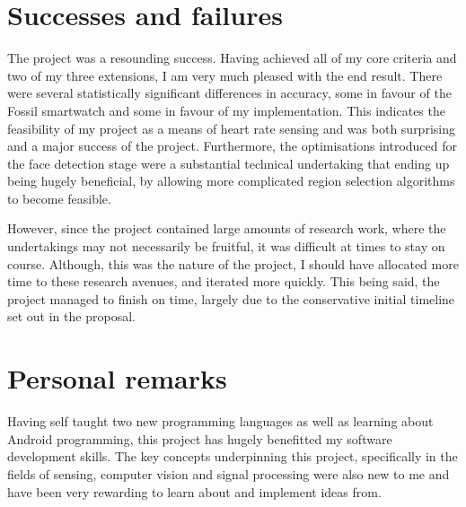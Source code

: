 \section{Successes and failures}
The project was a resounding success. Having achieved all of my core criteria and two of my three extensions, I am very much pleased with the end result.
There were several statistically significant differences in accuracy, some in favour of the Fossil smartwatch and some in favour of my implementation.
This indicates the feasibility of my project as a means of heart rate sensing and was both surprising and a major success of the project. 
Furthermore, the optimisations introduced for the face detection stage were a substantial technical undertaking that ending up being hugely beneficial, by
allowing more complicated region selection algorithms to become feasible.
\par 
However, since the project contained large amounts of research work, where the undertakings may not necessarily be fruitful, it was difficult at times to stay on course.
Although, this was the nature of the project, I should have allocated more time to these research avenues, and iterated more quickly. This being said, the project
managed to finish on time, largely due to the conservative initial timeline set out in the proposal.

\section{Personal remarks}
Having self taught two new programming languages as well as learning about Android programming, this project has hugely benefitted my software development 
skills. The key concepts underpinning this project, specifically in the fields of sensing, computer vision and signal processing were also new to me 
and have been very rewarding to learn about and implement ideas from.

